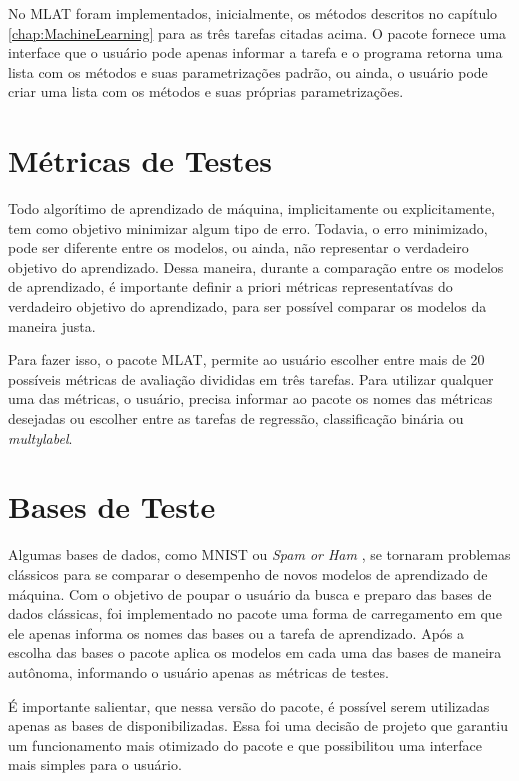 No MLAT foram implementados, inicialmente, os métodos descritos no capítulo \ref{chap:MachineLearning} para as três tarefas citadas acima. O pacote fornece uma interface que o usuário pode apenas informar a tarefa e o programa retorna uma lista com os métodos e suas parametrizações padrão, ou ainda, o usuário pode criar uma lista com os métodos e suas próprias parametrizações. 

\section{Métricas de Testes}
\label{sec:Metricas}
Todo algorítimo de aprendizado de máquina, implicitamente ou explicitamente, tem como objetivo minimizar algum tipo de erro. Todavia, o erro minimizado, pode ser diferente entre os modelos, ou ainda, não representar o verdadeiro objetivo do aprendizado. Dessa maneira, durante a comparação entre os modelos de aprendizado, é importante definir a priori métricas representatívas do verdadeiro objetivo do aprendizado, para ser possível comparar os modelos da maneira justa.

Para fazer isso, o pacote MLAT, permite ao usuário escolher entre mais de 20 possíveis métricas de avaliação divididas em três tarefas. Para utilizar qualquer uma das métricas, o usuário, precisa informar ao pacote os nomes das métricas desejadas ou escolher entre as tarefas de regressão, classificação binária ou \textit{multylabel}.

\section{Bases de Teste}
\label{sec:Bases}
Algumas bases de dados, como MNIST \cite{lecun} ou \textit{Spam or Ham} \cite{zezim}, se tornaram problemas clássicos para se comparar o desempenho de novos modelos de aprendizado de máquina. Com o objetivo de poupar o usuário da busca e preparo das bases de dados clássicas, foi implementado no pacote uma forma de carregamento em que ele apenas informa os nomes das bases ou a tarefa de aprendizado. Após a escolha das bases o pacote aplica os modelos em cada uma das bases de maneira autônoma, informando o usuário apenas as métricas de testes.

É importante salientar, que nessa versão do pacote, é possível serem utilizadas apenas as bases de disponibilizadas. Essa foi uma decisão de projeto que garantiu um funcionamento mais otimizado do pacote e que possibilitou uma interface mais simples para o usuário. 

